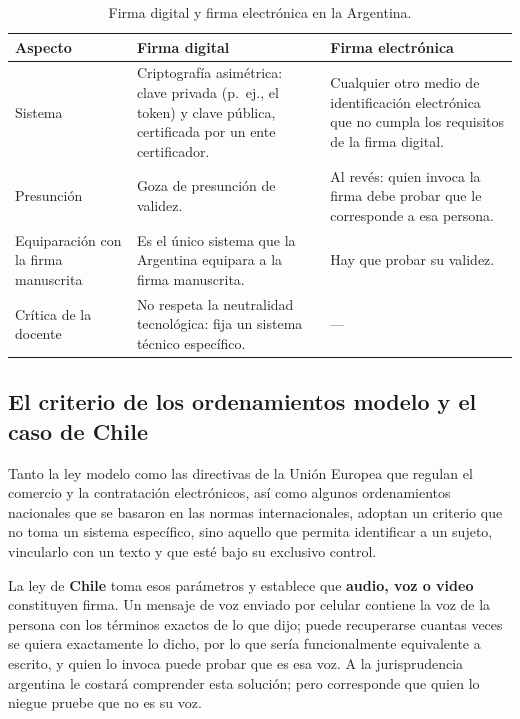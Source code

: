 \documentclass[12pt,oneside]{book}
\begin{document}
\begin{table}[H]
\centering
\small
\caption{Firma digital y firma electrónica en la Argentina.}
\begin{tabularx}{\textwidth}{>{\raggedright\arraybackslash}p{} Y Y}
\toprule
\textbf{Aspecto} & \textbf{Firma digital} & \textbf{Firma electrónica} \\
\midrule
Sistema & Criptografía asimétrica: clave privada (p.\ ej., el token) y clave pública, certificada por un ente certificador. & Cualquier otro medio de identificación electrónica que no cumpla los requisitos de la firma digital. \\
Presunción & Goza de presunción de validez. & Al revés: quien invoca la firma debe probar que le corresponde a esa persona. \\
Equiparación con la firma manuscrita & Es el único sistema que la Argentina equipara a la firma manuscrita. & Hay que probar su validez. \\
Crítica de la docente & No respeta la neutralidad tecnológica: fija un sistema técnico específico. & --- \\
\bottomrule
\end{tabularx}
\end{table}

\subsection{El criterio de los ordenamientos modelo y el caso de Chile}

Tanto la ley modelo como las directivas de la Unión Europea que regulan el comercio y la contratación electrónicos, así como algunos ordenamientos nacionales que se basaron en las normas internacionales, adoptan un criterio que no toma un sistema específico, sino aquello que permita identificar a un sujeto, vincularlo con un texto y que esté bajo su exclusivo control.

La ley de \textbf{Chile} toma esos parámetros y establece que \textbf{audio, voz o video} constituyen firma. Un mensaje de voz enviado por celular contiene la voz de la persona con los términos exactos de lo que dijo; puede recuperarse cuantas veces se quiera exactamente lo dicho, por lo que sería funcionalmente equivalente a escrito, y quien lo invoca puede probar que es esa voz. A la jurisprudencia argentina le costará comprender esta solución; pero corresponde que quien lo niegue pruebe que no es su voz.
\end{document}
